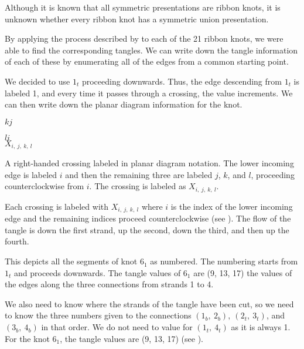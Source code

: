 \begin{paper}
Although it is known that all symmetric presentations are ribbon knots, it is
unknown whether every ribbon knot has a symmetric union presentation.


By applying the process described by \thmRibbon to each of the 21 ribbon knots,
we were able to find the corresponding tangles.
We can write down the tangle information of each of these by enumerating all of
the edges from a common starting point.

We decided to use $1_t$ proceeding downwards.
Thus, the edge descending from $1_t$ is labeled 1, and every time it passes
through a crossing, the value increments.
We can then write down the planar diagram information for the knot.

{\hspace{0.3in}\hspace{0.175\columnwidth}$k$\hspace{0.4\columnwidth}$j$
\begin{center}\end{center}

\hspace{0.3in}\hspace{0.175\columnwidth}$l$\hspace{0.4\columnwidth}$i$\\

\hspace{0.3in}\hspace{0.31\columnwidth}$X_{i,~j,~k,~l}$}
{A right-handed crossing labeled in planar diagram notation.
The lower incoming edge is labeled $i$ and then the remaining three are
labeled $j$, $k$, and $l$, proceeding counterclockwise from $i$.
The crossing is labeled as $X_{i,~j,~k,~l}$.}

Each crossing is labeled with $X_{i,~j,~k,~l}$ where $i$ is the index of the
lower incoming edge and the remaining indices proceed counterclockwise (see
\figCrossing).
The flow of the tangle is down the first strand, up the second, down the third,
and then up the fourth.

{This depicts all the segments of knot $6_1$ as numbered.
The numbering starts from $1_t$ and proceeds downwards.
The tangle values of $6_1$ are (9, 13, 17) the values of the edges along the
three connections from strands 1 to 4.}

We also need to know where the strands of the tangle have been cut, so we need
to know the three numbers given to the connections $(1_b,~2_b),~(2_t,~3_t)$, and
$(3_b,~4_b)$ in that order.
We do not need to value for $(1_t,~4_t)$ as it is always 1.
For the knot $6_1$, the tangle values are (9, 13, 17) (see \figExample).


\end{paper}

